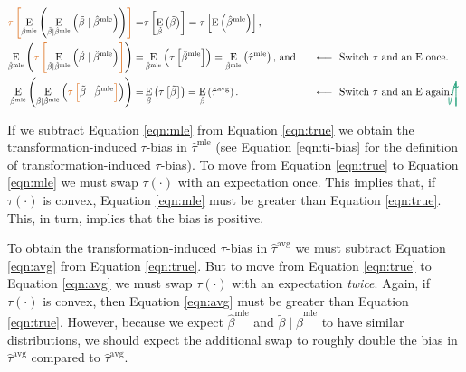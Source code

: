 \documentclass[11pt]{article}
\DeclareMathOperator*{\E}{\text{E}}
\newcommand{\tikzmark}[1]{\tikz[overlay,remember picture] \node (#1) {};}
\newcommand{\DrawBox}[2]{%
  \begin{tikzpicture}[overlay,remember picture]
    \draw[->,shorten >= 6pt, shorten <= 2pt, out=-90, in=90, distance=1.2cm, color2, thick] (MarkA.east) to (MarkB.east);
    \draw[->,shorten >= 6pt, shorten <= 2pt, out=-90, in=90, distance=1cm, color2, thick] (MarkC.west) to (MarkD.east);
  \end{tikzpicture}
}
\newcommand{\justif}[2]{&{#1}&\text{#2}}
\begin{document}
\begin{alignat}{2}
 \color{color1} \tikzmark{MarkA}\tau \left[ \normalcolor \E_{\hat{\beta}^\text{mle}}\left( \E_{\tilde{\beta} \mid \hat{\beta}^\text{mle}} \left( \tilde{\beta} \mid \hat{\beta}^\text{mle} \right) \right) \color{color1} \right] \normalcolor =&  \tau \left[ \E_{\tilde{\beta}} \left( \tilde{\beta} \right) \right] = \tau \left[\E \left( \hat{\beta}^\text{mle} \right) \right]\text{,} \label{eqn:true}\\
 \E_{\hat{\beta}^\text{mle}}\left( \color{color1} \tikzmark{MarkB}\tau\tikzmark{MarkC} \left[ \normalcolor \E_{\tilde{\beta} \mid \hat{\beta}^\text{mle}} \left( \tilde{\beta} \mid \hat{\beta}^\text{mle} \right) \color{color1} \right] \normalcolor \right)  =&  \E_{\hat{\beta}^\text{mle}} \left( \tau \left[\hat{\beta}^\text{mle} \right] \right) =  \E_{\hat{\beta}^\text{mle}} \left(\hat{\tau}^\text{mle} \right) \text{, and} \justif{\quad}{$\longleftarrow~$ Switch $\tau$ and an $\E$ once.} \label{eqn:mle}\\
\E_{\hat{\beta}^\text{mle}}\left( \E_{\tilde{\beta} \mid \hat{\beta}^\text{mle}} \left( \color{color1} \tikzmark{MarkD}\tau \left[ \normalcolor \tilde{\beta} \mid \hat{\beta}^\text{mle} \color{color1} \right] \normalcolor \right) \right)  =&
\E_{\tilde{\beta}} \left( \tau \left[\tilde{\beta} \right] \right)  =
\E_{\tilde{\beta}} \left(\hat{\tau}^\text{avg} \right) \text{.}\justif{\quad}{$\longleftarrow~$ Switch $\tau$ and an $\E$ again.}\label{eqn:avg}\DrawBox{red}{blue}
\end{alignat}

If we subtract Equation \ref{eqn:mle} from Equation \ref{eqn:true} we obtain the transformation-induced $\tau$-bias in $\hat{\tau}^\text{mle}$ (see Equation \ref{eqn:ti-bias} for the definition of transformation-induced $\tau$-bias).
To move from Equation \ref{eqn:true} to Equation \ref{eqn:mle} we must swap $\tau(\cdot)$ with an expectation once.
This implies that, if $\tau(\cdot)$ is convex, Equation \ref{eqn:mle} must be greater than Equation \ref{eqn:true}.
This, in turn, implies that the bias is positive.

To obtain the transformation-induced $\tau$-bias in $\hat{\tau}^\text{avg}$ we must subtract Equation \ref{eqn:avg} from Equation \ref{eqn:true}.
But to move from Equation \ref{eqn:true} to Equation \ref{eqn:avg} we must swap $\tau(\cdot)$ with an expectation \emph{twice}.
Again, if $\tau(\cdot)$ is convex, then Equation \ref{eqn:avg} must be greater than Equation \ref{eqn:true}.
However, because we expect $\hat{\beta}^\text{mle}$ and $\tilde{\beta} \mid \hat{\beta}^\text{mle}$ to have similar distributions, we should expect the additional swap to roughly double the bias in $\hat{\tau}^\text{avg}$ compared to $\hat{\tau}^\text{avg}$.
\end{document}
